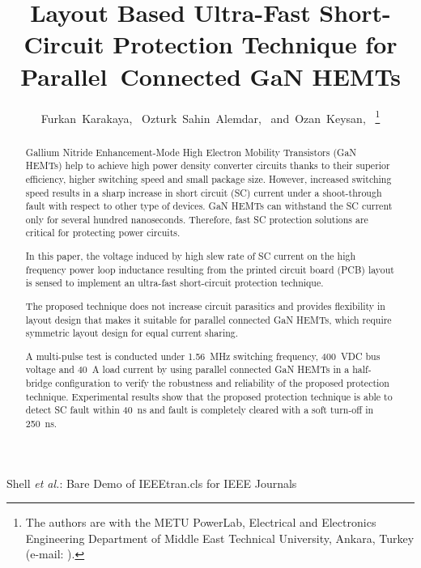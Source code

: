 \documentclass[journal]{IEEEtran}
\begin{document}
\title{Layout Based Ultra-Fast Short-Circuit Protection Technique for Parallel~Connected GaN HEMTs}

\author{Furkan~Karakaya,~
        Ozturk~Sahin~Alemdar,~
        and~Ozan~Keysan,~%
\thanks{The authors are with the METU PowerLab, Electrical and Electronics Engineering Department of Middle East Technical University, Ankara, Turkey (e-mail: ).}
}


%
{Shell \MakeLowercase{\textit{et al.}}: Bare Demo of IEEEtran.cls for IEEE Journals}


\maketitle
\begin{abstract}

Gallium Nitride Enhancement-Mode High Electron Mobility Transistors (GaN HEMTs) help to achieve high power density converter circuits thanks to their superior efficiency, higher switching speed and small package size.
However, increased switching speed results in a sharp increase in short circuit (SC) current under a shoot-through fault with respect to other type of devices. GaN HEMTs can withstand the SC current only for several hundred nanoseconds. Therefore, fast SC protection solutions are critical for protecting power circuits.

In this paper, the voltage induced by high slew rate of SC current on the high frequency power loop inductance resulting from the printed circuit board (PCB) layout is sensed to implement an ultra-fast short-circuit protection technique.

The proposed technique does not increase circuit parasitics and provides flexibility in layout design that makes it suitable for parallel connected GaN HEMTs, which require symmetric layout design for equal current sharing.

A multi-pulse test is conducted under 1.56~MHz switching frequency, 400~VDC bus voltage and 40~A load current by using parallel connected GaN HEMTs in a half-bridge configuration to verify the robustness and reliability of the proposed protection technique.
Experimental results show that the proposed protection technique is able to detect SC fault within 40~ns and fault is completely cleared with a soft turn-off in 250~ns.

\end{abstract}
\end{document}
